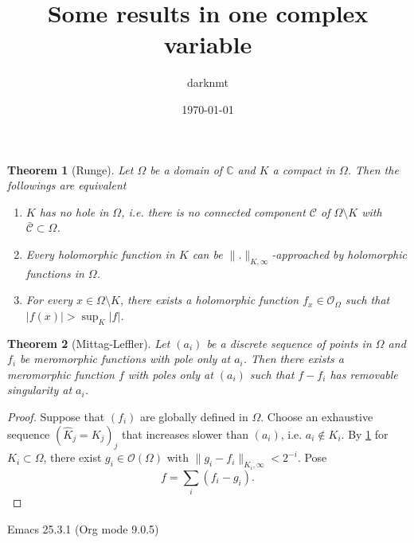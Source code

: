 \documentclass[11pt]{article}
\author{darknmt}
\date{\today}
\title{Some results in one complex variable}
\newtheorem{theorem}{Theorem}
\begin{document}
\maketitle
\tableofcontents

\iffalse
\begin{info}
The PDF version of this page can be downloaded by replacing \texttt{html} in the its address by
\texttt{pdf}. 
For example \texttt{/html/sheaf-cohomology.html} should become \texttt{/pdf/sheaf-cohomology.pdf}.
\end{info}
\fi

\begin{theorem}[Runge]
\label{thm:runge}
Let \(\Omega\) be a domain of \(\mathbb{C}\) and \(K\) a compact in \(\Omega\). Then the followings are equivalent
\begin{enumerate}
\item \(K\) \emph{has no hole} in \(\Omega\), i.e. there is no connected component \(\mathcal{C}\) of \(\Omega \setminus K\) with \(\bar{\mathcal{C}} \subset \Omega\).
\item Every holomorphic function in \(K\) can be \(\|.\|_{K,\infty}\)-approached by
holomorphic functions in \(\Omega\).
\item For every \(x\in \Omega\setminus K\), there exists a holomorphic function \(f_x \in
   \mathcal{O}_{\Omega}\) such that \(|f(x)| > \sup_K |f|\).
\end{enumerate}
\end{theorem}


\begin{theorem}[Mittag-Leffler]
\label{thm:mittag-leffler}
Let \((a_i)\) be a discrete sequence of points in \(\Omega\) and \(f_i\) be
meromorphic functions with pole only at \(a_i\). Then there exists a meromorphic
function \(f\) with poles only at \((a_i)\) such that \(f-f_i\) has removable
singularity at \(a_i\).
\end{theorem}

\begin{proof}
Suppose that \((f_i)\) are globally defined in \(\Omega\). Choose an exhaustive
sequence \((\hat K_j=K_j)_j\) that increases slower than \((a_i)\), i.e. \(a_i \not
\in K_{i}\). By \ref{thm:runge} for \(K_i\subset \Omega\), there exist \(g_i\in
\mathcal{O}(\Omega)\) with \(\|g_i - f_i\|_{K_i,\infty} < 2^{-i}\). Pose
\[
f = \sum_i (f_i-g_i).
\]
\end{proof}
Emacs 25.3.1 (Org mode 9.0.5)
\end{document}
